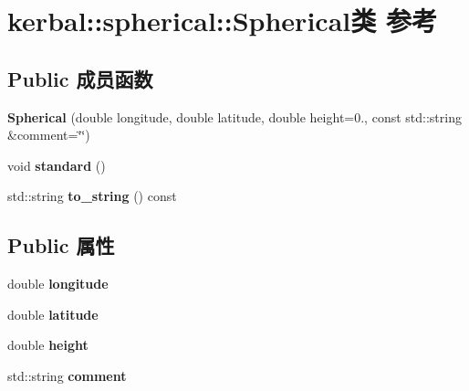 \hypertarget{classkerbal_1_1spherical_1_1_spherical}{}\section{kerbal\+:\+:spherical\+:\+:Spherical类 参考}
\label{classkerbal_1_1spherical_1_1_spherical}
\subsection*{Public 成员函数}
\begin{DoxyCompactItemize}
\item 
\mbox{\label{classkerbal_1_1spherical_1_1_spherical_a8e9e0e624e2eed096e4c22b59c308af8}} 
{\bfseries Spherical} (double longitude, double latitude, double height=0., const std\+::string \&comment=\char`\"{}\char`\"{})
\item 
\mbox{\label{classkerbal_1_1spherical_1_1_spherical_a7e1fb98918765dc20e75eb109114ab69}} 
void {\bfseries standard} ()
\item 
\mbox{\label{classkerbal_1_1spherical_1_1_spherical_a13bf2b5b005796bbe7619ecf69a437db}} 
std\+::string {\bfseries to\+\_\+string} () const
\end{DoxyCompactItemize}
\subsection*{Public 属性}
\begin{DoxyCompactItemize}
\item 
\mbox{\label{classkerbal_1_1spherical_1_1_spherical_a7f5717b55dfbad266bcac03aafb8792d}} 
double {\bfseries longitude}
\item 
\mbox{\label{classkerbal_1_1spherical_1_1_spherical_a9229e9758bcc200d9f71c6386b679210}} 
double {\bfseries latitude}
\item 
\mbox{\label{classkerbal_1_1spherical_1_1_spherical_a229f04afd9dc4a0026842ca1ff3f4c3c}} 
double {\bfseries height}
\item 
\mbox{\label{classkerbal_1_1spherical_1_1_spherical_a960f29dcd2ef93cc1e2a252bf45ce7aa}} 
std\+::string {\bfseries comment}
\end{DoxyCompactItemize}
